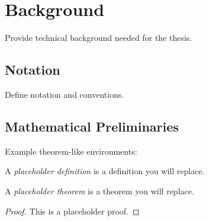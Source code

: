 \chapter{Background}

Provide technical background needed for the thesis.

\section{Notation}
Define notation and conventions.

\section{Mathematical Preliminaries}
Example theorem-like environments:

\begin{definition}
A \emph{placeholder definition} is a definition you will replace.
\end{definition}

\begin{theorem}
A \emph{placeholder theorem} is a theorem you will replace.
\end{theorem}

\begin{proof}
This is a placeholder proof.
\end{proof}
